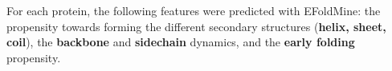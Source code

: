 For each protein, the following features were predicted with EFoldMine:
the propensity towards forming the different secondary structures (\textbf{helix, sheet, coil}),
the \textbf{backbone} and \textbf{sidechain} dynamics,
and the \textbf{early folding} propensity.

